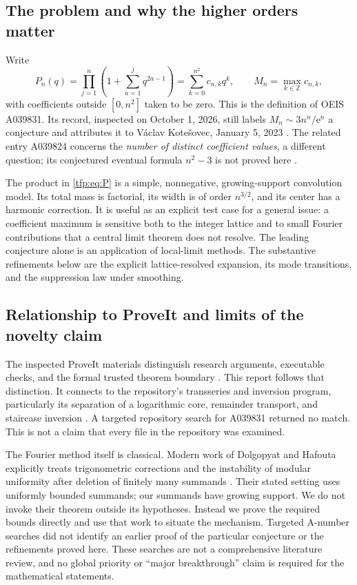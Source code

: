 \documentclass[11pt,a4paper]{article}
\numberwithin{equation}{section}
\theoremstyle{definition}\newtheorem{definition}[theorem]{Definition}
\theoremstyle{remark}\newtheorem{remark}[theorem]{Remark}
\newcommand{\Z}{\mathbb Z}\newcommand{\R}{\mathbb R}
\newcommand{\ee}{\mathrm e}
\begin{document}
\subsection{The problem and why the higher orders matter}
Write
\begin{equation}\label{tfp:eq:P}
 P_n(q)=\prod_{j=1}^n\left(1+\sum_{a=1}^j q^{2a-1}\right)
       =\sum_{k=0}^{n^2}c_{n,k}q^k,
 \qquad M_n=\max_{k\in\Z}c_{n,k},
\end{equation}
with coefficients outside $[0,n^2]$ taken to be zero. This is the definition
of OEIS A039831. Its record, inspected on October 1, 2026, still labels
$M_n\sim3n^n/\ee^n$ a conjecture and attributes it to V\'aclav Kote\v{s}ovec,
January 5, 2023 \cite{oeis831}. The related entry A039824 concerns the
\emph{number of distinct coefficient values}, a different question; its
conjectured eventual formula $n^2-3$ is not proved here \cite{oeis824}.

The product in \eqref{tfp:eq:P} is a simple, nonnegative, growing-support
convolution model. Its total mass is factorial, its width is of order
$n^{3/2}$, and its center has a harmonic correction. It is useful as an
explicit test case for a general issue: a coefficient maximum is sensitive
both to the integer lattice and to small Fourier contributions that a
central limit theorem does not resolve. The leading conjecture alone is an
application of local-limit methods. The substantive refinements below are
the explicit lattice-resolved expansion, its mode transitions, and the
suppression law under smoothing.

\subsection{Relationship to ProveIt and limits of the novelty claim}
The inspected ProveIt materials distinguish research arguments, executable
checks, and the formal trusted theorem boundary \cite{proveit}. This report
follows that distinction. It connects to the repository's transseries and
inversion program, particularly its separation of a logarithmic core,
remainder transport, and staircase inversion \cite{transseries}. A targeted
repository search for A039831 returned no match. This is not a claim that
every file in the repository was examined.

The Fourier method itself is classical. Modern work of Dolgopyat and
Hafouta explicitly treats trigonometric corrections and the instability of
modular uniformity after deletion of finitely many summands
\cite{dolgopyat}. Their stated setting uses uniformly bounded summands;
our summands have growing support. We do not invoke their theorem outside
its hypotheses. Instead we prove the required bounds directly and use
that work to situate the mechanism. Targeted A-number searches did not
identify an earlier proof of the particular conjecture or the refinements
proved here. These searches are not a comprehensive literature review,
and no global priority or ``major breakthrough'' claim is required for
the mathematical statements.
\end{document}
